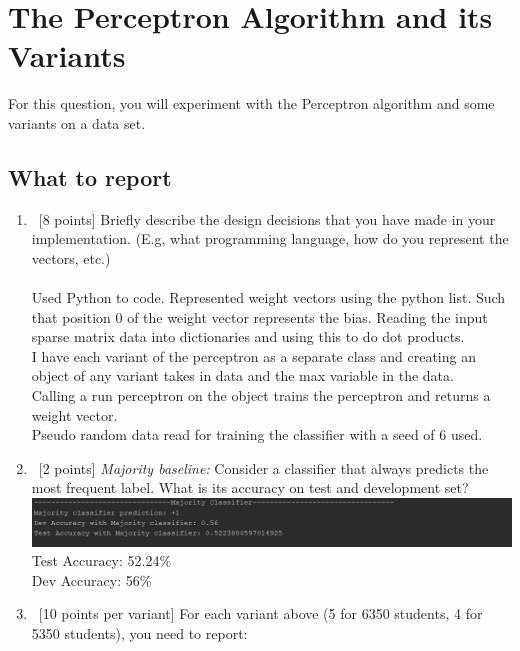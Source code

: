 \section{The Perceptron Algorithm and its Variants}\label{sec:q4}

For this question, you will experiment with the Perceptron algorithm
and some variants on a data set.


\subsection{What to report}

\begin{enumerate}
\item~[8 points] Briefly describe the design decisions that you have
  made in your implementation. (E.g, what programming language, how do
  you represent the vectors, etc.)\\\\
  Used Python to code. Represented weight vectors using the python list. Such that position 0 of the weight vector represents the bias. Reading the input sparse matrix data into dictionaries and using this to do dot products.\\
  I have each variant of the perceptron as a separate class and creating an object of any variant takes in data and the max variable in the data.\\
  Calling a run perceptron on the object trains the perceptron and returns a weight vector.\\
  Pseudo random data read for training the classifier with a seed of 6 used.
\item~[2 points] {\em Majority baseline:} Consider a classifier that
  always predicts the most frequent label. What is its accuracy on
  test and development set?\\
  \includegraphics[width=\textwidth]{maj_class.PNG}\\
  Test Accuracy: 52.24\%\\
  Dev Accuracy: 56\%
\item~[10 points per variant] For each variant above (5 for 6350 students, 4 for 5350 students), you need to report:\\

\end{enumerate}
